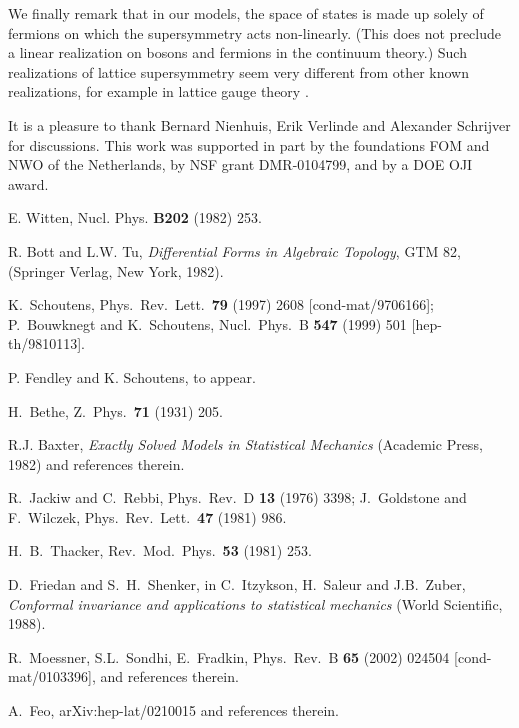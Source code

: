 \documentclass[a4paper,prl,aps,twocolumn]{revtex4}
\begin{document}
We finally remark that in our models, the space
of states is made up solely of fermions on which the supersymmetry acts
non-linearly. (This does not preclude a linear realization 
on bosons and fermions in the continuum theory.)
Such realizations of \coordHE{} lattice
supersymmetry seem very different from other 
known realizations, for example in lattice gauge theory \cite{feo}. 


It is a pleasure to thank Bernard Nienhuis, Erik Verlinde and 
Alexander Schr\-ijver for discussions. 
This work was supported in part by the foundations FOM and NWO 
of the Netherlands, by NSF grant DMR-0104799, and by a DOE OJI award. 
  
\vskip 3mm  
  
\begin{thebibliography}{99}  
  
E. Witten, Nucl. Phys. \textbf{B202} (1982) 253.  

 
R. Bott and L.W. Tu, {\it Differential Forms in Algebraic Topology},
GTM 82, (Springer Verlag, New York, 1982).

  

K.~Schoutens,
Phys.\ Rev.\ Lett.\  {\bf 79} (1997) 2608
[cond-mat/9706166];
P.~Bouwknegt and K.~Schoutens,
Nucl.\ Phys.\ B {\bf 547} (1999) 501
[hep-th/9810113].
 
P. Fendley and K. Schoutens, to appear.  
  
H.~Bethe,  
Z.\ Phys.\  {\bf 71} (1931) 205.
  
R.J. Baxter, {\it Exactly Solved Models in Statistical  
Mechanics} (Academic Press, 1982) and references therein.  
  
  R.~Jackiw and C.~Rebbi,  
Phys.\ Rev.\ D {\bf 13} (1976) 3398;  
J.~Goldstone and F.~Wilczek,  
Phys.~Rev.~Lett.\  {\bf 47} (1981) 986.  
  
 H.~B.~Thacker,  
Rev.\ Mod.\ Phys.\  {\bf 53} (1981) 253.  
  
D.~Friedan and S.~H.~Shenker,   
in  
C.~Itzykson, H.~Saleur and J.B.~Zuber,  
{\it Conformal invariance and applications to statistical mechanics} %
(World Scientific, 1988).  
    
R.~Moessner, S.L.~Sondhi, E.~Fradkin,  
Phys.\ Rev.\ B {\bf 65} (2002) 024504 [cond-mat/0103396],
and references therein.  
  
A.~Feo,
arXiv:hep-lat/0210015 and references therein.


\end{thebibliography}  
  
\end{document}
